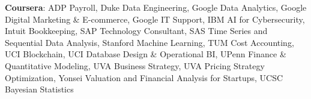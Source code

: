\textbf{Coursera}: ADP Payroll, Duke Data Engineering, Google Data Analytics, Google Digital Marketing \& E-commerce, Google IT Support, IBM AI for Cybersecurity, Intuit Bookkeeping, SAP Technology Consultant, SAS Time Series and Sequential Data Analysis, Stanford Machine Learning, TUM Cost Accounting, UCI Blockchain, UCI Database Design \& Operational BI, UPenn Finance \& Quantitative Modeling, UVA Business Strategy, UVA Pricing Strategy Optimization, Yonsei Valuation and Financial Analysis for Startups, UCSC Bayesian Statistics 
